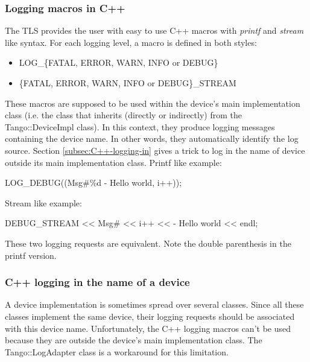 \subsubsection{Logging macros in C++}

The TLS provides the user with easy to use C++ macros with \emph{printf}
and \emph{stream} like syntax. For each logging level, a macro is
defined in both styles:
\begin{itemize}
\item LOG\_\{FATAL, ERROR, WARN, INFO or DEBUG\}
\item \{FATAL, ERROR, WARN, INFO or DEBUG\}\_STREAM
\end{itemize}
These macros are supposed to be used within the device's main implementation
class (i.e. the class that inherits (directly or indirectly) from
the Tango::DeviceImpl class). In this context, they produce logging
messages containing the device name. In other words, they automatically
identify the log source. Section \ref{subsec:C++-logging-in} gives
a trick to log in the name of device outside its main implementation
class. Printf like example:



LOG\_DEBUG((\textquotedbl{}Msg\#\%d - Hello world\textquotedbl{},
i++));



Stream like example:



DEBUG\_STREAM <\textcompwordmark{}< \textquotedbl{}Msg\#\textquotedbl{}
<\textcompwordmark{}< i++ <\textcompwordmark{}< \textquotedbl{}- Hello
world\textquotedbl{} <\textcompwordmark{}< endl;   



These two logging requests are equivalent. Note the double parenthesis
in the printf version.

\subsubsection{C++ logging in the name of a device\label{subsec:C++-logging-in}}

A device implementation is sometimes spread over several classes.
Since all these classes implement the same device, their logging requests
should be associated with this device name. Unfortunately, the C++
logging macros can't be used because they are outside the device's
main implementation class. The Tango::LogAdapter class is a workaround
for this limitation.

